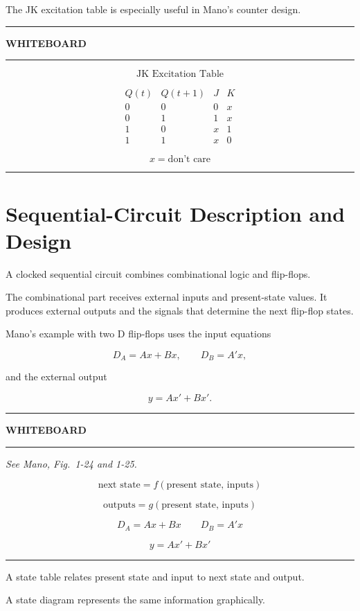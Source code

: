 \documentclass[11pt]{article}
\newenvironment{whiteboard}
{
    \par\medskip
    \hrule
    \vspace{0.35em}
    \noindent\textbf{\large WHITEBOARD}
    \par\vspace{0.3em}
    \hrule
    \vspace{0.65em}
}
{
    \vspace{0.45em}
    \hrule
    \par\medskip
}
\newcommand{\seeMano}[1]{%
    \textit{See Mano, Fig.~#1.}\par\smallskip
}
\begin{document}
The JK excitation table is especially useful in Mano's counter design.

\begin{whiteboard}

\[
\boxed{\text{JK Excitation Table}}
\]

\[
\begin{array}{cc|cc}
Q(t)&Q(t+1)&J&K\\
\hline
0&0&0&x\\
0&1&1&x\\
1&0&x&1\\
1&1&x&0
\end{array}
\]

\[
\boxed{x=\text{don't care}}
\]

\end{whiteboard}

\section{Sequential-Circuit Description and Design}

A clocked sequential circuit combines combinational logic and flip-flops.

The combinational part receives external inputs and present-state values. It
produces external outputs and the signals that determine the next flip-flop
states.

Mano's example with two D flip-flops uses the input equations

\[
D_A=Ax+Bx,
\qquad
D_B=A'x,
\]

and the external output

\[
y=Ax'+Bx'.
\]

\begin{whiteboard}

\seeMano{1-24 and 1-25}

\[
\boxed{
\text{next state}
=
f(\text{present state, inputs})
}
\]

\[
\boxed{
\text{outputs}
=
g(\text{present state, inputs})
}
\]

\[
\boxed{D_A=Ax+Bx}
\qquad
\boxed{D_B=A'x}
\]

\[
\boxed{y=Ax'+Bx'}
\]

\end{whiteboard}

A state table relates present state and input to next state and output.

A state diagram represents the same information graphically.
\end{document}
